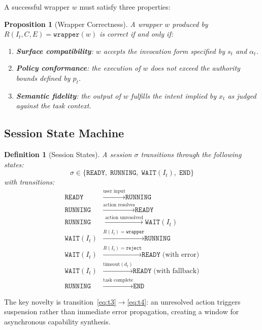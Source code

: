 \documentclass[11pt]{article}
\newtheorem{definition}{Definition}
\newtheorem{proposition}{Proposition}
\begin{document}
A successful wrapper $w$ must satisfy three properties:

\begin{proposition}[Wrapper Correctness]
A wrapper $w$ produced by $R(I_t, C, E) = \texttt{wrapper}(w)$ is correct if and only if:
\begin{enumerate}[leftmargin=*]
  \item \textbf{Surface compatibility}: $w$ accepts the invocation form specified by $s_t$ and $\alpha_t$.
  \item \textbf{Policy conformance}: the execution of $w$ does not exceed the authority bounds defined by $p_t$.
  \item \textbf{Semantic fidelity}: the output of $w$ fulfills the intent implied by $x_t$ as judged against the task context.
\end{enumerate}
\end{proposition}

\subsection{Session State Machine}

\begin{definition}[Session States]
A session $\sigma$ transitions through the following states:
\[
\sigma \in \{\texttt{READY},\; \texttt{RUNNING},\; \texttt{WAIT}(I_t),\; \texttt{END}\}
\]
with transitions:
\begin{align}
\texttt{READY} &\xrightarrow{\text{user input}} \texttt{RUNNING} \label{eq:t1}\\
\texttt{RUNNING} &\xrightarrow{\text{action resolves}} \texttt{READY} \label{eq:t2}\\
\texttt{RUNNING} &\xrightarrow{\text{action unresolved}} \texttt{WAIT}(I_t) \label{eq:t3}\\
\texttt{WAIT}(I_t) &\xrightarrow{R(I_t) = \texttt{wrapper}} \texttt{RUNNING} \label{eq:t4}\\
\texttt{WAIT}(I_t) &\xrightarrow{R(I_t) = \texttt{reject}} \texttt{READY}\;\text{(with error)} \label{eq:t5}\\
\texttt{WAIT}(I_t) &\xrightarrow{\text{timeout}(d_t)} \texttt{READY}\;\text{(with fallback)} \label{eq:t6}\\
\texttt{RUNNING} &\xrightarrow{\text{task complete}} \texttt{END} \label{eq:t7}
\end{align}
\end{definition}

The key novelty is transition~\eqref{eq:t3}$\to$\eqref{eq:t4}: an unresolved action triggers suspension rather than immediate error propagation, creating a window for asynchronous capability synthesis.
\end{document}
